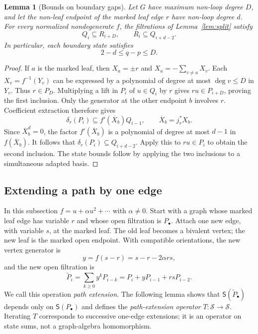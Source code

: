 \documentclass[reqno]{article}
\theoremstyle{plain} %
\newtheorem{lemma}[theorem]{Lemma}
\theoremstyle{definition}
\theoremstyle{remark}
\numberwithin{equation}{section}
\begin{document}
\begin{lemma}[Bounds on boundary gaps]\label{lem:boundary-gap}
Let $G$ have maximum non-loop degree $D$, and let the non-leaf endpoint
of the marked leaf edge $r$ have non-loop degree $d$. For every
normalized nondegenerate $f$, the filtrations of Lemma~\ref{lem:split}
satisfy
\begin{equation}\label{eq:boundary-gap-inclusions}
Q_i\subseteq R_{i+D},\qquad R_i\subseteq Q_{i+d-2}.
\end{equation}
In particular, each boundary state satisfies
\begin{equation}\label{eq:boundary-gap-bound}
2-d\le q-p\le D.
\end{equation}
\end{lemma}
\begin{proof}
If $a$ is the marked leaf, then $X_a=\pm r$ and
$X_a=-\sum_{v\ne a}X_v$. Each $X_v=f^{-1}(Y_v)$ can be expressed by a
polynomial of degree at most $\deg v\le D$ in $Y_v$. Thus $r\in P_D$.
Multiplying a lift in $P_i$ of $u\in Q_i$ by $r$ gives
$ru\in P_{i+D}$, proving the first inclusion.
Only the generator at the other endpoint $b$ involves $r$.
Coefficient extraction therefore gives
\[
\delta_r(P_i)\subseteq f'(\overline X_b)Q_{i-1},
\qquad \overline X_b=j_r^*X_b.
\]
Since $\overline X_b^d=0$, the factor $f'(\overline X_b)$ is a polynomial
of degree at most $d-1$ in $f(\overline X_b)$. It follows that
$\delta_r(P_i)\subseteq Q_{i+d-2}$. Apply this to $ru\in P_i$ to obtain
the second inclusion. The state bounds follow by applying the two
inclusions to a simultaneous adapted basis.
\end{proof}


\subsection{Extending a path by one edge}
\label{sec:boundary-propagation}

In this subsection $f=u+\alpha u^2+\cdots$ with $\alpha\ne0$.
Start with a graph whose marked leaf edge has variable $r$ and whose
open filtration is $P_\bullet$. Attach one new edge, with variable $s$,
at the marked leaf. The old leaf becomes a bivalent vertex; the new
leaf is the marked open endpoint. With compatible orientations, the
new vertex generator is
\[
 y=f(s-r)=s-r-2\alpha rs,
\]
and the new open filtration is
\[
 \widetilde P_i=\sum_{k\ge0}y^kP_{i-k}
              =P_i+yP_{i-1}+rsP_{i-2}.
\]
We call this operation \emph{path extension}. The following lemma
shows that $\mathsf S(\widetilde P_\bullet)$ depends only on
$\mathsf S(P_\bullet)$ and defines the \emph{path-extension operator}
$T:\mathcal S\to\mathcal S$. Iterating $T$ corresponds to successive
one-edge extensions; it is an operator on state sums, not a graph-algebra
homomorphism.
\end{document}
